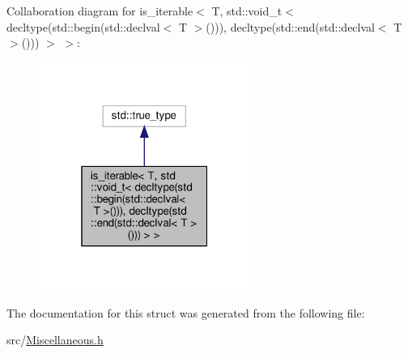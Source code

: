 Collaboration diagram for is\+\_\+iterable$<$ T, std\+:\+:void\+\_\+t$<$ decltype(std\+:\+:begin(std\+:\+:declval$<$ T $>$())), decltype(std\+:\+:end(std\+:\+:declval$<$ T $>$())) $>$ $>$\+:\nopagebreak
\begin{figure}[H]
\begin{center}
\leavevmode
\includegraphics[width=196pt]{structis__iterable_3_01_t_00_01std_1_1void__t_3_01decltype_07std_1_1begin_07std_1_1declval_3_01_b067d8048764f6340460e1309cc193bd}
\end{center}
\end{figure}


The documentation for this struct was generated from the following file\+:\begin{DoxyCompactItemize}
\item 
src/\hyperlink{_miscellaneous_8h}{Miscellaneous.\+h}\end{DoxyCompactItemize}
